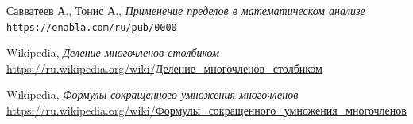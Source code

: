\documentclass[12pt]{article}
\begin{document}
\begin{thebibliography}{9}
	Савватеев А., Тонис А., \textit{Применение пределов в математическом анализе}
	\\\texttt{\url{https://enabla.com/ru/pub/0000}}
	
	Wikipedia, \textit{Деление многочленов столбиком}
	\\\href{https://ru.wikipedia.org/wiki/\%D0\%94\%D0\%B5\%D0\%BB\%D0\%B5\%D0\%BD\%D0\%B8\%D0\%B5_\%D0\%BC\%D0\%BD\%D0\%BE\%D0\%B3\%D0\%BE\%D1\%87\%D0\%BB\%D0\%B5\%D0\%BD\%D0\%BE\%D0\%B2_\%D1\%81\%D1\%82\%D0\%BE\%D0\%BB\%D0\%B1\%D0\%B8\%D0\%BA\%D0\%BE\%D0\%BC}{https://ru.wikipedia.org/wiki/Деление\_многочленов\_столбиком}

	Wikipedia, \textit{Формулы сокращенного умножения многочленов}
	\\\href{https://ru.wikipedia.org/wiki/\%D0\%A4\%D0\%BE\%D1\%80\%D0\%BC\%D1\%83\%D0\%BB\%D1\%8B\_\%D1\%81\%D0\%BE\%D0\%BA\%D1\%80\%D0\%B0\%D1\%89\%D1\%91\%D0\%BD\%D0\%BD\%D0\%BE\%D0\%B3\%D0\%BE\_\%D1\%83\%D0\%BC\%D0\%BD\%D0\%BE\%D0\%B6\%D0\%B5\%D0\%BD\%D0\%B8\%D1\%8F\_\%D0\%BC\%D0\%BD\%D0\%BE\%D0\%B3\%D0\%BE\%D1\%87\%D0\%BB\%D0\%B5\%D0\%BD\%D0\%BE\%D0\%B2}{https://ru.wikipedia.org/wiki/Формулы\_сокращенного\_умножения\_многочленов}

\end{thebibliography}
\end{document}
